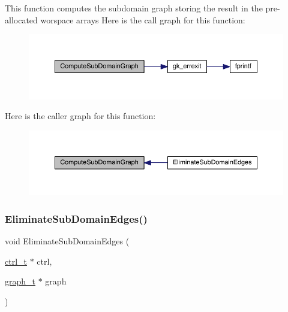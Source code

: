 This function computes the subdomain graph storing the result in the pre-\/allocated worspace arrays Here is the call graph for this function\+:\nopagebreak
\begin{figure}[H]
\begin{center}
\leavevmode
\includegraphics[width=350pt]{a00242_a78c50bcdffefbd90914a77c4add573cc_cgraph}
\end{center}
\end{figure}
Here is the caller graph for this function\+:\nopagebreak
\begin{figure}[H]
\begin{center}
\leavevmode
\includegraphics[width=350pt]{a00242_a78c50bcdffefbd90914a77c4add573cc_icgraph}
\end{center}
\end{figure}
\mbox{\label{a00242_a6dab60a85abb88ada807831e84cb84fc}} 
\subsubsection{\texorpdfstring{Eliminate\+Sub\+Domain\+Edges()}{EliminateSubDomainEdges()}}
{\footnotesize\ttfamily void Eliminate\+Sub\+Domain\+Edges (\begin{DoxyParamCaption}\item[{\hyperlink{a00742}{ctrl\+\_\+t} $\ast$}]{ctrl,  }\item[{\hyperlink{a00734}{graph\+\_\+t} $\ast$}]{graph }\end{DoxyParamCaption})}

